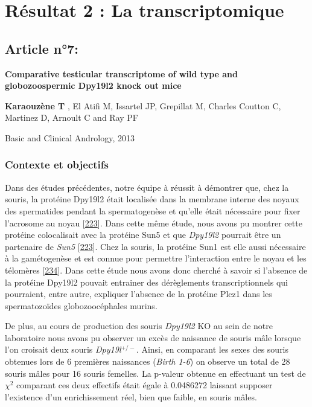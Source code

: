 \documentclass[12pt,a4paper,twoside]{ugathesis}
\theoremstyle{definition}
\theoremstyle{definition}
\theoremstyle{definition}
\theoremstyle{remark}
\begin{document}
\newpage

\section{Résultat 2 : La transcriptomique}\label{transcriptome}

\subsection{Article n°7:}\label{article-n7}

\textbf{Comparative testicular transcriptome of wild type and
globozoospermic Dpy19l2 knock out mice}

\textbf{Karaouzène T} , El Atifi M, Issartel JP, Grepillat M, Charles
Coutton C, Martinez D, Arnoult C and Ray PF

Basic and Clinical Andrology, 2013

\newpage

\subsubsection{Contexte et objectifs}\label{contexte-et-objectifs-6}

Dans des études précédentes, notre équipe à réussit à démontrer que,
chez la souris, la protéine Dpy19l2 était localisée dans la membrane
interne des noyaux des spermatides pendant la spermatogenèse et qu'elle
était nécessaire pour fixer l'acrosome au noyau
{[}\protect\hyperlink{ref-Pierre2012}{223}{]}. Dans cette même étude,
nous avons pu montrer cette protéine colocalisait avec la protéine Sun5
et que \emph{Dpy19l2} pourrait être un partenaire de \emph{Sun5}
{[}\protect\hyperlink{ref-Pierre2012}{223}{]}. Chez la souris, la
protéine Sun1 est elle aussi nécessaire à la gamétogenèse et est connue
pour permettre l'interaction entre le noyau et les télomères
{[}\protect\hyperlink{ref-Ding2007}{234}{]}. Dans cette étude nous avons
donc cherché à savoir si l'absence de la protéine Dpy19l2 pouvait
entrainer des dérèglements transcriptionnels qui pourraient, entre
autre, expliquer l'absence de la protéine Plcz1 dans les spermatozoïdes
globozoocéphales murins.

De plus, au cours de production des souris \emph{Dpy19l2} KO au sein de
notre laboratoire nous avons pu observer un excès de naissance de souris
mâle lorsque l'on croisait deux souris \emph{Dpy19l}\(^{+/-}\). Ainsi,
en comparant les sexes des souris obtenues lors de 6 premières
naissances (\emph{Birth 1-6}) on observe un total de 28 souris mâles
pour 16 souris femelles. La p-valeur obtenue en effectuant un test de
\(\chi^2\) comparant ces deux effectifs était égale à 0.0486272 laissant
supposer l'existence d'un enrichissement réel, bien que faible, en
souris mâles.
\end{document}
